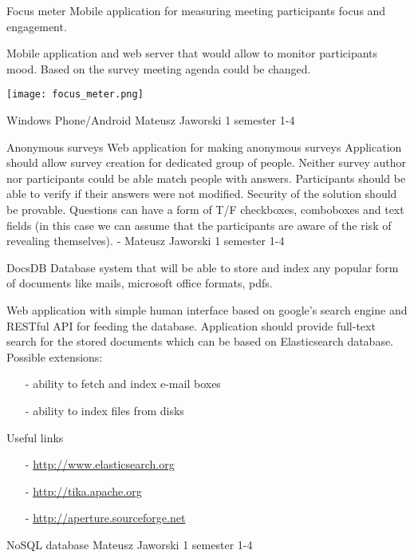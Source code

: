 \begin{project}
{Focus meter}
{Mobile application for measuring meeting participants focus and engagement.}
{
Mobile application and web server that would allow to
monitor participants mood. Based on the survey meeting
agenda could be changed.
\begin{center}\texttt{[image: focus\_meter.png]}\end{center}
}
{Windows Phone/Android}
{Mateusz Jaworski}
{1 semester}
{1-4}
\end{project}
\begin{project}
{Anonymous surveys}
{Web application for making anonymous surveys}
{
Application should allow survey creation for dedicated group of people. 
Neither survey author nor participants could be able match people with answers.
Participants should be able to verify if their answers were not modified. 
Security of the solution should be provable. Questions can have a form of T/F
checkboxes, comboboxes and text fields (in this case we can assume that the
participants are aware of the risk of revealing themselves).
}
{-}
{Mateusz Jaworski}
{1 semester}
{1-4}
\end{project}
\begin{project}
{DocsDB}
{Database system that will be able to store and index any popular form of
documents like mails, microsoft office formats, pdfs.}
{
Web application with simple human interface based on google's search engine and
RESTful API for feeding the database.
Application should provide full-text search for the stored documents which can be based on Elasticsearch database.
Possible extensions:
\begin{itemize}
  \item[-] ability to fetch and index e-mail boxes
  \item[-] ability to index files from disks
\end{itemize}
Useful links
\begin{itemize}
  \item[-] \url{http://www.elasticsearch.org}
  \item[-] \url{http://tika.apache.org}
  \item[-] \url{http://aperture.sourceforge.net}
\end{itemize}
}
{NoSQL database}
{Mateusz Jaworski}
{1 semester}
{1-4}
\end{project}
